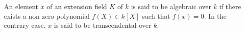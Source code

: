 An element $x$ of an extension field $K$ of $k$ is said to be algebraic over $k$ if there exists a non-zero polynomial $f(X) \in k[X]$ such that $f(x) = 0$. In the contrary case, $x$ is said to be transcendental over $k$.
